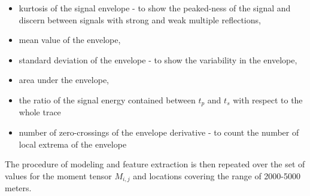 \documentclass[letterpaper,11pt]{article}
\begin{document}
\begin{itemize}
 \item kurtosis of the signal envelope - to show the peaked-ness of the signal and discern between signals with strong and weak multiple reflections,
 \item mean value of the envelope,
 \item standard deviation of the envelope - to show the variability in the envelope,
 \item area under the envelope,
 \item the ratio of the signal energy contained between $t_{p}$ and $t_{s}$ with respect to the whole trace
 \item number of zero-crossings of the envelope derivative - to count the number of local extrema of the envelope
\end{itemize}
The procedure of modeling and feature extraction is then repeated over the set of values for the moment tensor $M_{i,j}$ and locations covering the range of 2000-5000 meters.
\end{document}
